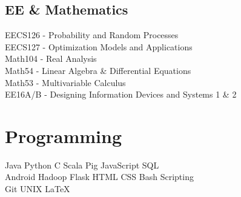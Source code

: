 \documentclass[]{format}
\begin{document}
\begin{minipage}[t]{0.33\textwidth}
\subsection{EE \& Mathematics}
EECS126 - Probability and Random Processes \\
EECS127 - Optimization Models and Applications \\
Math104 - Real Analysis \\
Math54 - Linear Algebra \& Differential Equations \\
Math53 - Multivariable Calculus \\
EE16A/B - Designing Information Devices and Systems 1 \& 2

\sectionsep


\section{Programming}
Java \textbullet{}   Python \textbullet{} C \textbullet{} Scala \textbullet{} Pig \textbullet{} JavaScript  \textbullet{} SQL \\
Android \textbullet{} Hadoop \textbullet{} Flask \textbullet{} HTML \textbullet{} CSS \textbullet{} Bash Scripting \\
Git \textbullet{} UNIX \textbullet{} LaTeX
\sectionsep

%
%

\end{minipage} 
\hfill
\end{document}
